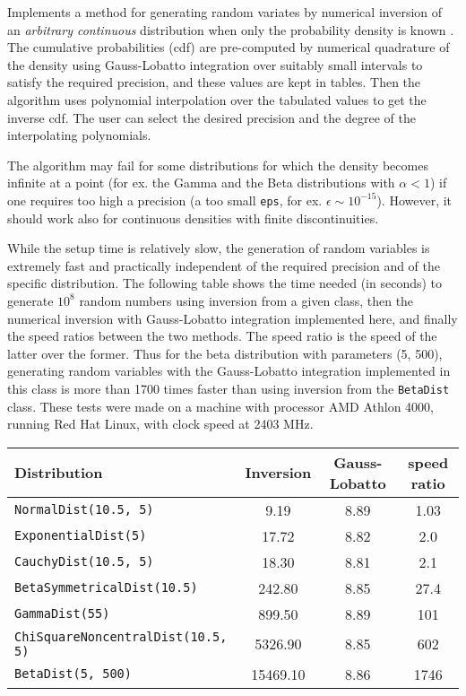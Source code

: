 
Implements a method for generating random variates by numerical inversion of
an \emph{arbitrary continuous} distribution when only the probability density
is known \cite{rDER10a}.  The cumulative probabilities (cdf) are pre-computed by
 numerical quadrature  of the
density using Gauss-Lobatto integration over suitably small intervals to
satisfy the required precision, and these values are kept in tables. Then the
 algorithm uses polynomial interpolation  over the tabulated values to get
  the inverse cdf. The user can select the
  desired precision and the degree of the interpolating polynomials.

The algorithm may fail for some distributions for which the density
 becomes infinite at a point (for ex. the Gamma and the Beta distributions
 with $\alpha < 1$)  if one requires too high a precision
(a  too small \texttt{eps}, for ex. $\epsilon \sim 10^{-15}$).
However, it should work also for continuous densities with finite discontinuities.


While the setup time is relatively slow, the generation of random variables
is extremely fast and practically independent of the required precision
and of the specific distribution. The following table shows the time needed
(in seconds) to generate $10^8$ random numbers using inversion
from a given class, then the numerical inversion with Gauss-Lobatto integration
implemented here, and finally the speed ratios between the two methods.
The speed ratio is  the speed of the latter over the former.
Thus for the beta distribution with parameters (5, 500), generating random
variables with the Gauss-Lobatto integration implemented in this class is
more than 1700
times faster than using inversion from the \texttt{BetaDist} class.
These tests were made on a machine with processor AMD Athlon 4000, running
Red Hat Linux, with clock speed at 2403 MHz.

\begin{center}
\begin{tabular}{|l|c|c|c|}
\hline
 Distribution  & Inversion  & Gauss-Lobatto &  speed ratio  \\
\hline
\texttt{NormalDist(10.5, 5)} & \phantom{1521}9.19 & 8.89 &  \phantom{16222}1.03  \\
\texttt{ExponentialDist(5)}  & \phantom{152}17.72 &8.82 & \phantom{1622}2.0 \\
\texttt{CauchyDist(10.5, 5)} & \phantom{152}18.30 & 8.81 & \phantom{1622}2.1     \\
\texttt{BetaSymmetricalDist(10.5)}   & \phantom{15}242.80 & 8.85 &  \phantom{162}27.4  \\
\texttt{GammaDist(55)} &  \phantom{15}899.50 &8.89 & \phantom{1}101  \\
\texttt{ChiSquareNoncentralDist(10.5, 5)} &\phantom{1}5326.90 &8.85 &  \phantom{1}602  \\
\texttt{BetaDist(5, 500)} & 15469.10 &8.86 &  1746  \\
\hline
\end{tabular}
\end{center}

